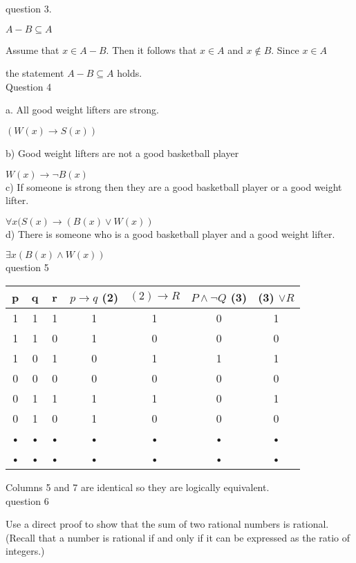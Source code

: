 \documentclass[11pt]{article}
\begin{document}
question 3. 

$ A - B \subseteq A$

Assume that $x \in A-B$. Then it follows that $x \in A$ and $x \notin B$. Since $x \in A$

 the statement $ A - B \subseteq A$ holds.\\ 

Question 4

a. All good weight lifters are strong.

$ (W(x) \rightarrow S(x))$

b) Good weight lifters are not a good basketball player

$ W(x) \rightarrow \neg B(x)$\\

c) If someone is strong then they are a good basketball player or a good weight lifter.

$ \forall x (S(x) \rightarrow (B(x) \lor W(x))$\\

d) There is someone who is a good basketball player and a good weight lifter.

$ \exists x (B(x) \land W(x))$
\\

question 5\\

\begin{tabular}{|c|c|c|c|c|c|c|}
\hline 
p & q & r & $p \rightarrow q$ (2) & $ (2) \rightarrow R$ & $P \land \neg Q$ (3) & (3) $\lor R$ \\ 
\hline 
1 & 1 & 1 & 1 & 1 & 0 & 1 \\ 
\hline 
1 & 1 & 0 & 1 & 0 & 0 & 0 \\ 
\hline 
1 & 0 & 1 & 0 & 1 & 1 & 1 \\ 
\hline 
0 & 0 & 0 & 0 & 0 & 0 & 0 \\ 
\hline 
0 & 1 & 1 & 1 & 1 & 0 & 1 \\ 
\hline 
0 & 1 & 0 & 1 & 0 & 0 & 0 \\ 
\hline 
• & • & • & • & • & • & • \\ 
\hline 
• & • & • & • & • & • & • \\ 
\hline 
\end{tabular} 

Columns 5 and 7 are identical so they are logically equivalent. 
\\

question 6

Use a direct proof to show that the sum of two rational numbers is rational. (Recall that a number is rational if and only if it can be expressed as the ratio of integers.)\\
\end{document}
